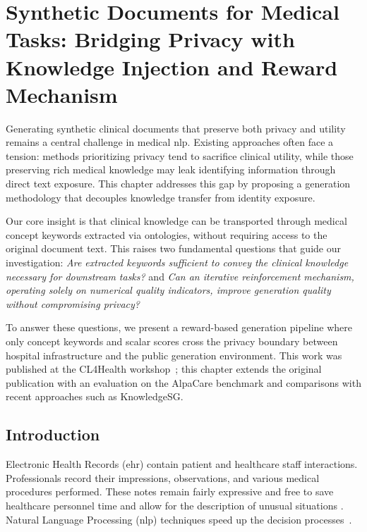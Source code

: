 \chapter{Synthetic Documents for Medical Tasks: Bridging Privacy with Knowledge Injection and Reward Mechanism}
\label{chap:synthetic}

Generating synthetic clinical documents that preserve both privacy and utility remains a central challenge in medical \gls{nlp}.
Existing approaches often face a tension: methods prioritizing privacy tend to sacrifice clinical utility, while those preserving rich medical knowledge may leak identifying information through direct text exposure.
This chapter addresses this gap by proposing a generation methodology that decouples knowledge transfer from identity exposure.

Our core insight is that clinical knowledge can be transported through medical concept keywords extracted via ontologies, without requiring access to the original document text.
This raises two fundamental questions that guide our investigation: \textit{Are extracted keywords sufficient to convey the clinical knowledge necessary for downstream tasks?} and \textit{Can an iterative reinforcement mechanism, operating solely on numerical quality indicators, improve generation quality without compromising privacy?}

To answer these questions, we present a reward-based generation pipeline where only concept keywords and scalar scores cross the privacy boundary between hospital infrastructure and the public generation environment.
This work was published at the CL4Health workshop~\citep{meoni2025synthetic}; this chapter extends the original publication with an evaluation on the AlpaCare benchmark and comparisons with recent approaches such as KnowledgeSG.

\clearpage
\minitoc

\section{Introduction}

Electronic Health Records (\gls{ehr}) contain patient and healthcare staff interactions. Professionals record their impressions, observations, and various medical procedures performed. These notes remain fairly expressive and free to save healthcare personnel time and allow for the description of unusual situations \citep{rosenbloomDataClinicalNotes2011, wuSurveyClinicalNatural2022}. Natural Language Processing (\gls{nlp}) techniques speed up the decision processes~\cite{zhouDataSifterTextPartiallySynthetic2022,wuSurveyClinicalNatural2022}.

